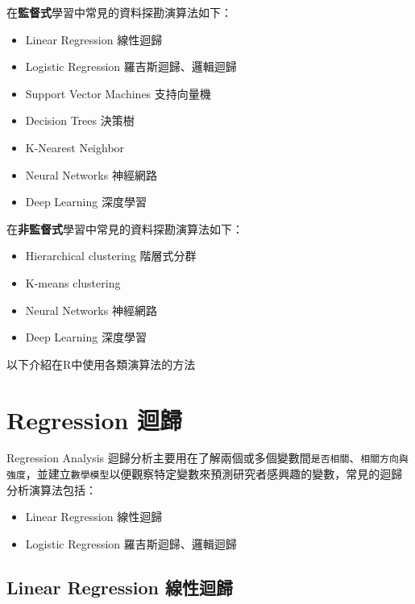 \documentclass[]{book}
\providecommand{\tightlist}{%
  \setlength{\itemsep}{0pt}\setlength{\parskip}{0pt}}
\begin{document}
在\textbf{監督式}學習中常見的資料探勘演算法如下：

\begin{itemize}
\tightlist
\item
  Linear Regression 線性迴歸
\item
  Logistic Regression 羅吉斯迴歸、邏輯迴歸
\item
  Support Vector Machines 支持向量機
\item
  Decision Trees 決策樹
\item
  K-Nearest Neighbor
\item
  Neural Networks 神經網路
\item
  Deep Learning 深度學習
\end{itemize}

在\textbf{非監督式}學習中常見的資料探勘演算法如下：

\begin{itemize}
\tightlist
\item
  Hierarchical clustering 階層式分群
\item
  K-means clustering
\item
  Neural Networks 神經網路
\item
  Deep Learning 深度學習
\end{itemize}

以下介紹在R中使用各類演算法的方法

\hypertarget{regression-ux8ff4ux6b78}{%
\section{Regression 迴歸}\label{regression-ux8ff4ux6b78}}

Regression Analysis 迴歸分析主要用在了解兩個或多個變數間\texttt{是否相關}、\texttt{相關方向與強度}，並建立\texttt{數學模型}以便觀察特定變數來預測研究者感興趣的變數，常見的迴歸分析演算法包括：

\begin{itemize}
\tightlist
\item
  Linear Regression 線性迴歸
\item
  Logistic Regression 羅吉斯迴歸、邏輯迴歸
\end{itemize}

\hypertarget{linear-regression-ux7ddaux6027ux8ff4ux6b78}{%
\subsection{Linear Regression 線性迴歸}\label{linear-regression-ux7ddaux6027ux8ff4ux6b78}}
\end{document}
